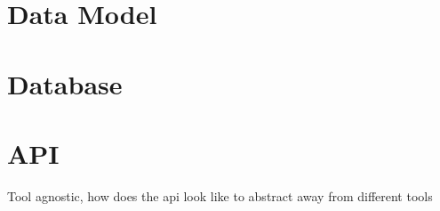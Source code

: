 

\section{Data Model}
\section{Database}
\section{API}
Tool agnostic, how does the api look like to abstract away from different tools
